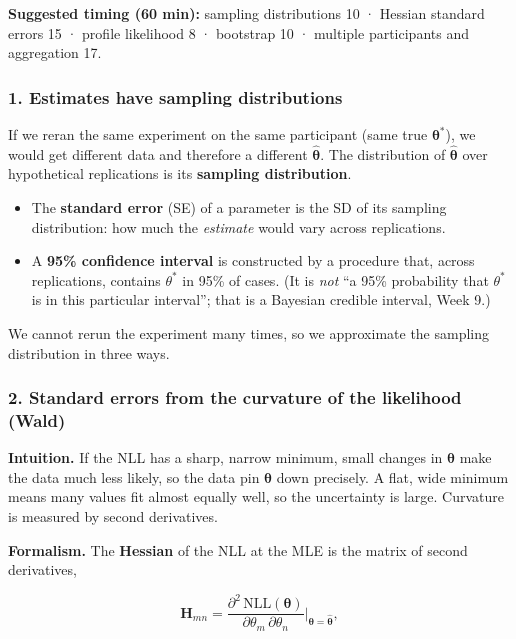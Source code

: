 \textbf{Suggested timing (60 min):} sampling distributions 10 · Hessian
standard errors 15 · profile likelihood 8 · bootstrap 10 · multiple
participants and aggregation 17.

\subsubsection{1. Estimates have sampling distributions}

If we reran the same experiment on the same participant (same true
\(\boldsymbol\theta^\ast\)), we would get different data and therefore a
different \(\hat{\boldsymbol\theta}\). The distribution of
\(\hat{\boldsymbol\theta}\) over hypothetical replications is its
\textbf{sampling distribution}.

\begin{itemize}
\tightlist
\item
  The \textbf{standard error} (SE) of a parameter is the SD of its
  sampling distribution: how much the \emph{estimate} would vary across
  replications.
\item
  A \textbf{95\% confidence interval} is constructed by a procedure
  that, across replications, contains \(\theta^\ast\) in 95\% of cases.
  (It is \emph{not} ``a 95\% probability that \(\theta^\ast\) is in this
  particular interval''; that is a Bayesian credible interval, Week 9.)
\end{itemize}

We cannot rerun the experiment many times, so we approximate the
sampling distribution in three ways.

\subsubsection{2. Standard errors from the curvature of the likelihood
(Wald)}

\textbf{Intuition.} If the NLL has a sharp, narrow minimum, small
changes in \(\boldsymbol\theta\) make the data much less likely, so the
data pin \(\boldsymbol\theta\) down precisely. A flat, wide minimum
means many values fit almost equally well, so the uncertainty is large.
Curvature is measured by second derivatives.

\textbf{Formalism.} The \textbf{Hessian} of the NLL at the MLE is the
matrix of second derivatives,

\[
\mathbf{H}_{mn} = \frac{\partial^2\, \mathrm{NLL}(\boldsymbol\theta)}{\partial\theta_m\,\partial\theta_n}\bigg|_{\boldsymbol\theta = \hat{\boldsymbol\theta}},
\]

